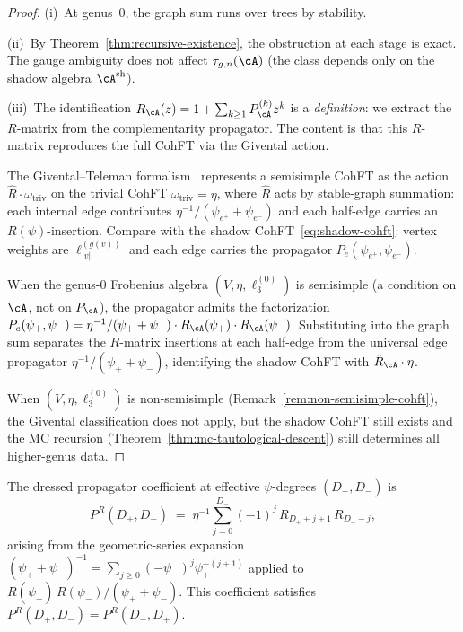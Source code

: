\begin{proof}
(i)~At genus~$0$, the graph sum runs over trees by stability.

\smallskip\noindent
(ii)~By Theorem~\ref{thm:recursive-existence}, the obstruction at each stage is
exact.  The gauge ambiguity does not affect $\tau_{g,n}(\cA)$
(the class depends only on the shadow algebra
$\cA^{\mathrm{sh}}$).

\smallskip\noindent
(iii)~The identification
$R_\cA(z) = 1 + \sum_{k \geq 1} P_\cA^{(k)} z^k$ is a
\emph{definition}: we extract the $R$-matrix from the
complementarity propagator.  The content is that this
$R$-matrix reproduces the full CohFT via the Givental
action.

The Givental--Teleman formalism~\cite{Givental01,Teleman12}
represents a semisimple CohFT as the action
$\hat{R} \cdot \omega_{\mathrm{triv}}$ on the trivial CohFT
$\omega_{\mathrm{triv}} = \eta$, where $\hat{R}$ acts by
stable-graph summation: each internal edge contributes
$\eta^{-1}/(\psi_{e^+}+\psi_{e^-})$ and each half-edge
carries an $R(\psi)$-insertion.  Compare with the shadow
CohFT~\eqref{eq:shadow-cohft}: vertex weights are
$\ell_{|v|}^{(g(v))}$ and each edge carries the
propagator $P_e(\psi_{e^+}, \psi_{e^-})$.

When the genus-$0$ Frobenius algebra
$(V, \eta, \ell_3^{(0)})$ is semisimple (a condition on
$\cA$, not on $P_\cA$), the propagator admits the
factorization
$P_e(\psi_+, \psi_-) = \eta^{-1}/(\psi_+ + \psi_-)
\cdot R_\cA(\psi_+) \cdot R_\cA(\psi_-)$.
Substituting into the graph sum separates the
$R$-matrix insertions at each half-edge from the
universal edge propagator $\eta^{-1}/(\psi_+ + \psi_-)$,
identifying the shadow CohFT with
$\hat{R}_\cA \cdot \eta$.

When $(V, \eta, \ell_3^{(0)})$ is non-semisimple
(Remark~\ref{rem:non-semisimple-cohft}), the Givental
classification does not apply, but the shadow CohFT
still exists and the MC recursion
(Theorem~\ref{thm:mc-tautological-descent}) still
determines all higher-genus data.
\end{proof}

\begin{proposition}
\label{prop:dressed-propagator-resolution}
\ClaimStatusProvedHere
{}
The dressed propagator coefficient at effective
$\psi$-degrees $(D_+, D_-)$ is
\begin{equation}\label{eq:dressed-propagator-coefficient}
P^R(D_+, D_-)
\;=\;
\eta^{-1}
\sum_{j=0}^{D_-} (-1)^j\, R_{D_+ + j + 1}\, R_{D_- - j},
\end{equation}
arising from the geometric-series expansion
$(\psi_+ + \psi_-)^{-1}
= \sum_{j \geq 0} (-\psi_-)^j \psi_+^{-(j+1)}$
applied to~$R(\psi_+)\,R(\psi_-)/(\psi_+ + \psi_-)$.
This coefficient satisfies
$P^R(D_+, D_-) = P^R(D_-, D_+)$.
\end{proposition}

